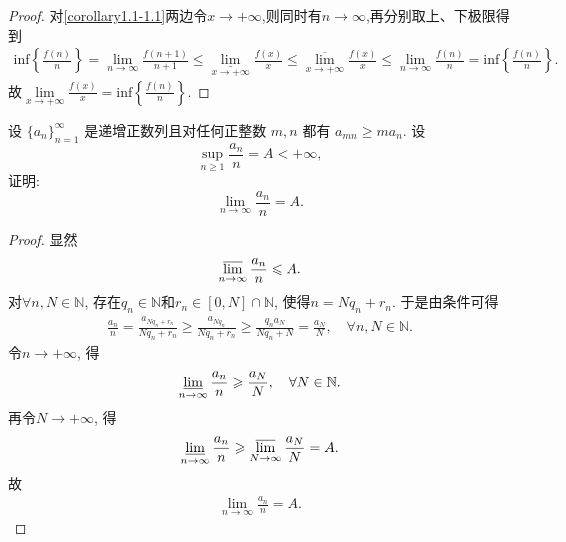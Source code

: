 \documentclass[../../main.tex]{subfiles}%
\begin{document}
\begin{proof}
对\eqref{corollary1.1-1.1}两边令$x\rightarrow +\infty$,则同时有$n\rightarrow \infty$,再分别取上、下极限得到
\begin{align*}
\mathrm{inf}\left\{ \frac{f\left( n \right)}{n} \right\} =\underset{n\rightarrow \infty}{\lim}\frac{f\left( n+1 \right)}{n+1}\leqslant \underset{x\rightarrow +\infty}{\underline{\lim }}\frac{f\left( x \right)}{x}\leqslant \underset{x\rightarrow +\infty}{\overline{\lim }}\frac{f\left( x \right)}{x}\leqslant \underset{n\rightarrow \infty}{\lim}\frac{f\left( n \right)}{n}=\mathrm{inf}\left\{ \frac{f\left( n \right)}{n} \right\}.
\end{align*}
故$\underset{x\rightarrow +\infty}{\lim}\frac{f\left( x \right)}{x}=\mathrm{inf}\left\{ \frac{f\left( n \right)}{n} \right\}$.

\end{proof}

\begin{example}
设 $\{a_n\}_{n=1}^{\infty}$ 是递增正数列且对任何正整数 $m,n$ 都有 $a_{mn} \geqslant ma_n$. 设
\[
\sup_{n\geqslant 1} \frac{a_n}{n} = A < +\infty,
\]
证明:
\[
\lim_{n\to\infty} \frac{a_n}{n} = A.
\]
\end{example}
\begin{proof}

显然
\begin{align*}
\varlimsup\limits_{n\rightarrow \infty}\frac{a_n}{n}\leqslant A.
\end{align*}
对$\forall n,N\in \mathbb{N}$, 存在$q_n\in \mathbb{N}$和$r_n\in \left[ 0,N \right] \cap \mathbb{N}$, 使得$n=Nq_n+r_n$. 于是由条件可得
\begin{align*}
\frac{a_n}{n}=\frac{a_{Nq_n+r_n}}{Nq_n+r_n}\geqslant \frac{a_{Nq_n}}{Nq_n+r_n}\geqslant \frac{q_na_N}{Nq_n+N}=\frac{a_N}{N},\quad \forall n,N\in \mathbb{N}.
\end{align*}
令$n\rightarrow +\infty$, 得
\begin{align*}
\varliminf\limits_{n\rightarrow \infty}\frac{a_n}{n}\geqslant \frac{a_N}{N},\quad \forall N\in \mathbb{N}.
\end{align*}
再令$N\rightarrow +\infty$, 得
\begin{align*}
\varliminf\limits_{n\rightarrow \infty}\frac{a_n}{n}\geqslant \varlimsup\limits_{N\rightarrow \infty}\frac{a_N}{N}=A.
\end{align*}
故
\begin{align*}
\lim\limits_{n\rightarrow \infty}\frac{a_n}{n}=A.
\end{align*}

\end{proof}
\end{document}
